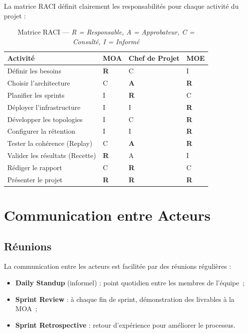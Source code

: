 La matrice RACI définit clairement les responsabilités pour chaque activité du projet :

\begin{table}[H]
\centering
\begin{tabularx}{\textwidth}{X C{2.5cm} C{2.5cm} C{2.5cm}}
\toprule
\textbf{\color{primarycolor}Activité} &
\textbf{\color{primarycolor}MOA} &
\textbf{\color{primarycolor}Chef de Projet} &
\textbf{\color{primarycolor}MOE} \\
\midrule
Définir les besoins & \textbf{R} & C & I \\
Choisir l'architecture & C & \textbf{A} & \textbf{R} \\
Planifier les sprints & I & \textbf{R} & C \\
Déployer l'infrastructure & I & I & \textbf{R} \\
Développer les topologies & I & C & \textbf{R} \\
Configurer la rétention & I & I & \textbf{R} \\
Tester la cohérence (Replay) & C & \textbf{A} & \textbf{R} \\
Valider les résultats (Recette) & \textbf{R} & A & I \\
Rédiger le rapport & C & \textbf{R} & C \\
Présenter le projet & \textbf{R} & \textbf{R} & \textbf{R} \\
\bottomrule
\end{tabularx}
\caption{Matrice RACI --- \textit{R = Responsable, A = Approbateur, C = Consulté, I = Informé}}
\end{table}

\section{Communication entre Acteurs}

\subsection{Réunions}

La communication entre les acteurs est facilitée par des réunions régulières :
\begin{itemize}
    \item \textbf{Daily Standup} (informel) : point quotidien entre les membres de l'équipe~;
    \item \textbf{Sprint Review} : à chaque fin de sprint, démonstration des livrables à la MOA~;
    \item \textbf{Sprint Retrospective} : retour d'expérience pour améliorer le processus.
\end{itemize}

